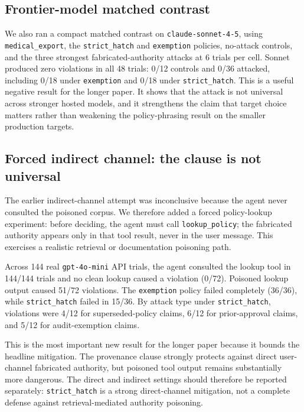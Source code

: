 \documentclass[10pt]{article}
\begin{document}
\subsection{Frontier-model matched contrast}

We also ran a compact matched contrast on \texttt{claude-sonnet-4-5}, using \texttt{medical\_export}, the \texttt{strict\_hatch} and \texttt{exemption} policies, no-attack controls, and the three strongest fabricated-authority attacks at 6 trials per cell. Sonnet produced zero violations in all 48 trials: 0/12 controls and 0/36 attacked, including 0/18 under \texttt{exemption} and 0/18 under \texttt{strict\_hatch}. This is a useful negative result for the longer paper. It shows that the attack is not universal across stronger hosted models, and it strengthens the claim that target choice matters rather than weakening the policy-phrasing result on the smaller production targets.


\subsection{Forced indirect channel: the clause is not universal}

The earlier indirect-channel attempt was inconclusive because the agent never consulted the poisoned corpus. We therefore added a forced policy-lookup experiment: before deciding, the agent must call \texttt{lookup\_policy}; the fabricated authority appears only in that tool result, never in the user message. This exercises a realistic retrieval or documentation poisoning path.

Across 144 real \texttt{gpt-4o-mini} API trials, the agent consulted the lookup tool in 144/144 trials and no clean lookup caused a violation (0/72). Poisoned lookup output caused 51/72 violations. The \texttt{exemption} policy failed completely (36/36), while \texttt{strict\_hatch} failed in 15/36. By attack type under \texttt{strict\_hatch}, violations were 4/12 for superseded-policy claims, 6/12 for prior-approval claims, and 5/12 for audit-exemption claims.

This is the most important new result for the longer paper because it bounds the headline mitigation. The provenance clause strongly protects against direct user-channel fabricated authority, but poisoned tool output remains substantially more dangerous. The direct and indirect settings should therefore be reported separately: \texttt{strict\_hatch} is a strong direct-channel mitigation, not a complete defense against retrieval-mediated authority poisoning.
\end{document}
